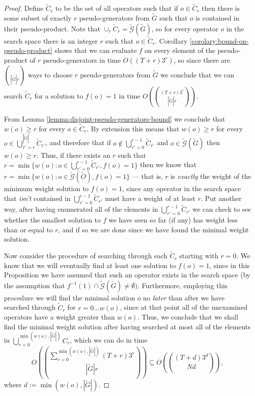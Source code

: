 \documentclass[12pt]{amsbook}
\theoremstyle{plain}
\theoremstyle{definition}
\theoremstyle{remark}
\newcommand{\set}{\tilde}
\newcommand{\genfun}{\tilde{\mathcal{G}}}
\newcommand{\paren}[1]{\left(#1\right)}
\begin{document}
\begin{proof}
Define $\set C_r$ to be the set of all operators such that if $o\in\set C_r$ then there is some subset of exactly $r$ pseudo-generators from $\set G$ such that $o$ is contained in their pseudo-product.  Note that $\cup_r \set C_r = \genfun(\set G)$, so for every operator $o$ in the search space there is an integer $r$ such that $o\in\set C_r$.  Corollary \ref{corolary:bound-on-pseudo-product} shows that we can evaluate $f$ on every element of the pseudo-product of $r$ pseudo-generators in time $O((T+r)3^r)$, so since there are $\choose{|\set G|}{r}$ ways to choose $r$ pseudo-generators from $\set G$ we conclude that we can search $\set C_r$ for a solution to $f(o)=1$ in time $O\paren{(T+r) 3^r \choose{|\set G|}{r}}$.

From Lemma \ref{lemma:disjoint-pseudo-generators-bound} we conclude that $w(o)\ge r$ for every $o\in\set C_r$.  By extension this means that $w(o)\ge r$ for every $o\in\bigcup_{r'=r}^{|\set G|}\set C_{r'}$, and therefore that if $o\notin\bigcup_{r'=0}^{r-1}\set C_{r'}$ and $o\in\genfun(\set G)$ then $w(o)\ge r$.  Thus, if there exists an $r$ such that $r=\min\{w(o): o\in\bigcup_{r'=0}^{r-1}\set C_{r'},f(o)=1\}$ then we know that $r=\min\{w(o):o\in\genfun(\set O),f(o)=1\}$ --- that is, $r$ is \emph{exactly} the weight of the minimum weight solution to $f(o)=1$, since any operator in the search space that \emph{isn't} contained in $\bigcup_{r'=0}^{r-1}\set C_{r'}$ must have a weight of at least $r$.  Put another way, after having enumerated all of the elements in $\bigcup_{r'=0}^{r-1}\set C_{r'}$ we can check to see whether the smallest solution to $f$ we have seen so far (if any) has weight less than or equal to $r$, and if so we are done since we have found the minimal weight solution.

Now consider the procedure of searching through each $\set C_r$ starting with $r=0$.  We know that we will eventually find at least one solution to $f(o)=1$, since in this Proposition we have assumed that such an operator exists in the search space (by the assumption that $f^{-1}(1)\cap\genfun(\set G)\ne\emptyset$).  Furthermore, employing this procedure we will find the minimal solution $o$ no \emph{later} than after we have searched through $\set C_r$ for $r=0\dots w(o)$, since at that point all of the unexamined operators have a weight greater than $w(o)$.  Thus, we conclude that we shall find the minimal weight solution after having searched at most all of the elements in $\bigcup_{r=0}^{\min(w(o),|\set G|)} C_r$, which we can do in time $$O\paren{\sum_{r=0}^{\min(w(o),|\set G|)}(T+r) 3^r \choose{|\set G|}{r}}\subseteq O\paren{(T+d) 3^d \choose{N}{d}},$$ where $d:=\min(w(o),|\set G|)$.
\end{proof}
\end{document}
